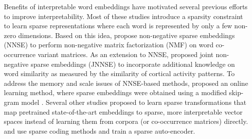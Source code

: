\documentclass[11pt,a4paper]{article}
\begin{document}
Benefits of interpretable word embeddings have motivated several previous efforts  to improve interpretability. Most of these studies introduce a sparsity constraint  to learn sparse representations where each word is represented by only a few non-zero dimensions. 
Based on this idea, \citet{murphy12nnse} propose non-negative sparse embeddings (NNSE)  to perform non-negative matrix factorization (NMF) on word co-occurrence variant matrices. As an extension to NNSE, \citet{fyshe14interpretable} proposed joint non-negative sparse embeddings (JNNSE) to incorporate additional knowledge on word similarity as measured by the similarity of cortical activity patterns. To address the memory and scale issues of NNSE-based methods, \citet{luo15online} proposed an online learning method, where sparse embeddings were obtained using a modified skip-gram model \citep{mikolov13word2vec_a}. Several other studies proposed to learn sparse transformations that map pretrained state-of-the-art embeddings to sparse, more interpretable vector spaces instead of learning them from corpora (or co-occurrence matrices) directly. \citet{arora18linalg} and \citet{faruqui15sparse} use sparse coding methods and \citep{subramanian18spine} train a sparse auto-encoder.

\end{document}
